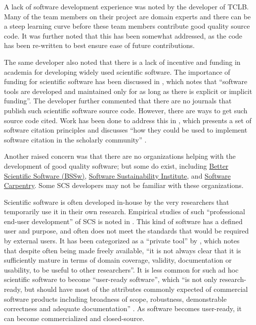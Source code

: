 \documentclass[12pt, notitlepage]{article}
\begin{document}
A lack of software development experience was noted by the developer of TCLB. Many of the team members on their project are domain experts and there can be a steep learning curve before these team members contribute good quality source code. It was further noted that this has been somewhat addressed, as the code has been re-written to best ensure ease of future contributions. 

The same developer also noted that there is a lack of incentive and funding in academia for developing widely used scientific software. The importance of funding for scientific software has been discussed in \cite{gewaltig2012quality}, which notes that ``software tools are developed and maintained only for as long as there is explicit or implicit funding''. The developer further commented that there are no journals that publish such scientific software source code. However, there are ways to get such source code cited. Work has been done to address this in \citep{smith2016software}, which presents a set of software citation principles and discusses ``how they could be used to implement software citation in the scholarly community'' \citep{katz2019software}. 

Another raised concern was that there are no organizations helping with the development of good quality software; but some do exist, including \href{https://bssw.io/}{Better Scientific Software (BSSw)}, \href{https://www.software.ac.uk/}{Software Sustainability Institute}, and \href{https://software-carpentry.org/}{Software Carpentry}. Some SCS developers may not be familiar with these organizations. 

Scientific software is often developed in-house by the very researchers that temporarily use it in their own research. Empirical studies of such ``professional end-user development'' of SCS is noted in \citep{segal2007end}. This kind of software has a defined user and purpose, and often does not meet the standards that would be required by external users. It has been categorized as a ``private tool'' by \citep{gewaltig2012quality}, which notes that despite often being made freely available, ``it is not always clear that it is sufficiently mature in terms of domain coverage, validity, documentation or usability, to be useful to other researchers''. It is less common for such ad hoc scientific software to become ``user-ready software'', which ``is not only research-ready, but should have most of the attributes commonly expected of commercial software products including broadness of scope, robustness, demonstrable correctness and adequate documentation'' \citep{gewaltig2012quality}. As software becomes user-ready, it can become commercialized and closed-source. 
\end{document}
